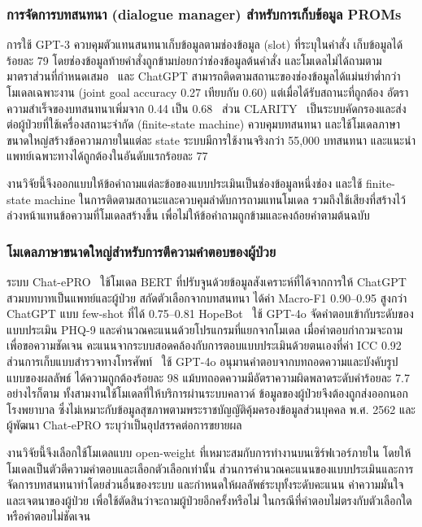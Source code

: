 \subsubsection{การจัดการบทสนทนา (dialogue manager) สำหรับการเก็บข้อมูล PROMs}
\label{sec:review-dialogue}

การใช้ GPT-3 ควบคุมตัวแทนสนทนาเก็บข้อมูลตามช่องข้อมูล (slot) ที่ระบุในคำสั่ง
เก็บข้อมูลได้ร้อยละ 79 โดยช่องข้อมูลท้ายคำสั่งถูกข้ามบ่อยกว่าช่องข้อมูลต้นคำสั่ง และโมเดลไม่ได้ถามตามมาตราส่วนที่กำหนดเสมอ~\citep{Wei2024}
และ ChatGPT สามารถติดตามสถานะของช่องข้อมูลได้แม่นยำต่ำกว่าโมเดลเฉพาะงาน (joint goal accuracy 0.27 เทียบกับ 0.60) แต่เมื่อได้รับสถานะที่ถูกต้อง อัตราความสำเร็จของบทสนทนาเพิ่มจาก 0.44 เป็น 0.68~\citep{Hudecek2023}
ส่วน CLARITY~\citep{Shaposhnikov2025} เป็นระบบคัดกรองและส่งต่อผู้ป่วยที่ใช้เครื่องสถานะจำกัด (finite-state machine) ควบคุมบทสนทนา
และใช้โมเดลภาษาขนาดใหญ่สร้างข้อความภายในแต่ละ state ระบบมีการใช้งานจริงกว่า 55,000 บทสนทนา และแนะนำแพทย์เฉพาะทางได้ถูกต้องในอันดับแรกร้อยละ 77

งานวิจัยนี้จึงออกแบบให้ข้อคำถามแต่ละข้อของแบบประเมินเป็นช่องข้อมูลหนึ่งช่อง และใช้ finite-state machine ในการติดตามสถานะและควบคุมลำดับการถามแทนโมเดล
รวมถึงใช้เสียงที่สร้างไว้ล่วงหน้าแทนข้อความที่โมเดลสร้างขึ้น เพื่อไม่ให้ข้อคำถามถูกข้ามและคงถ้อยคำตามต้นฉบับ \citep{Coons2009}

\subsubsection{โมเดลภาษาขนาดใหญ่สำหรับการตีความคำตอบของผู้ป่วย}
\label{sec:review-interpret}

ระบบ Chat-ePRO~\citep{Chen2024} ใช้โมเดล BERT ที่ปรับจูนด้วยข้อมูลสังเคราะห์ที่ได้จากการให้ ChatGPT สวมบทบาทเป็นแพทย์และผู้ป่วย
สกัดตัวเลือกจากบทสนทนา ได้ค่า Macro-F1 0.90--0.95 สูงกว่า ChatGPT แบบ few-shot ที่ได้ 0.75--0.81
HopeBot~\citep{Guo2025} ใช้ GPT-4o จัดคำตอบเข้ากับระดับของแบบประเมิน PHQ-9 และคำนวณคะแนนด้วยโปรแกรมที่แยกจากโมเดล
เมื่อคำตอบกำกวมจะถามเพื่อขอความชัดเจน คะแนนจากระบบสอดคล้องกับการตอบแบบประเมินด้วยตนเองที่ค่า ICC 0.92
ส่วนการเก็บแบบสำรวจทางโทรศัพท์~\citep{Kaiyrbekov2025} ใช้ GPT-4o อนุมานคำตอบจากบทถอดความและบังคับรูปแบบของผลลัพธ์
ได้ความถูกต้องร้อยละ 98 แม้บทถอดความมีอัตราความผิดพลาดระดับคำร้อยละ 7.7
อย่างไรก็ตาม ทั้งสามงานใช้โมเดลที่ให้บริการผ่านระบบคลาวด์ ข้อมูลของผู้ป่วยจึงต้องถูกส่งออกนอกโรงพยาบาล
ซึ่งไม่เหมาะกับข้อมูลสุขภาพตามพระราชบัญญัติคุ้มครองข้อมูลส่วนบุคคล พ.ศ. 2562 และผู้พัฒนา Chat-ePRO ระบุว่าเป็นอุปสรรคต่อการขยายผล~\citep{Chen2024}

งานวิจัยนี้จึงเลือกใช้โมเดลแบบ open-weight ที่เหมาะสมกับการทำงานบนเซิร์ฟเวอร์ภายใน โดยให้โมเดลเป็นตัวตีความคำตอบและเลือกตัวเลือกเท่านั้น 
ส่วนการคำนวณคะแนนของแบบประเมินและการจัดการบทสนทนาทำโดยส่วนอื่นของระบบ
และกำหนดให้ผลลัพธ์ระบุทั้งระดับคะแนน ค่าความมั่นใจ และเจตนาของผู้ป่วย เพื่อใช้ตัดสินว่าจะถามผู้ป่วยอีกครั้งหรือไม่
ในกรณีที่คำตอบไม่ตรงกับตัวเลือกใด หรือคำตอบไม่ชัดเจน